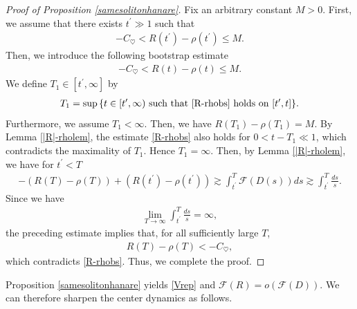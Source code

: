 \documentclass[10pt,a4paper]{amsart}
\numberwithin{equation}{section}
\begin{document}
\begin{proof}[Proof of Proposition \ref{samesolitonhanare}]
Fix an arbitrary constant $M>0$. First, we assume that there exists $t^{\prime}\gg 1$ such that 
\begin{align*}
-C_{\heartsuit}<R(t^{\prime})-\rho(t^{\prime})\leq M.
\end{align*}
Then, we introduce the following bootstrap estimate
\begin{align}\label{R-rhobs}
-C_{\heartsuit}<R(t)-\rho(t)\leq M.
\end{align}
We define $T_1\in [t^{\prime},\infty]$ by
\begin{align}\label{rho-RnoT1}
T_1=\sup{ \{t\in[t^{\prime},\infty)\ \mbox{such that}\ \eqref{R-rhobs}\ \mbox{holds on}\ [t^{\prime},t] \} }.
\end{align}
Furthermore, we assume $T_1<\infty$. Then, we have $R(T_1)-\rho(T_1)=M$. By Lemma \ref{|R|-rholem}, the estimate \eqref{R-rhobs} also holds for $0<t-T_1\ll 1$, which contradicts the maximality of $T_1$. Hence $T_1=\infty$. Then, by Lemma \ref{|R|-rholem}, we have for $t^{\prime}<T$
\begin{align*}
-\left(R(T)-\rho(T)\right)+\left(R(t^{\prime})-\rho(t^{\prime})\right)\gtrsim\int_{t^{\prime}}^T\mathcal{F}(D(s))ds\gtrsim \int_{t^{\prime}}^T\frac{ds}{s}.
\end{align*}
Since we have
\begin{align*}
\lim_{T\to\infty}\int_{t^{\prime}}^T\frac{ds}{s}=\infty,
\end{align*}
the preceding estimate implies that, for all sufficiently large $T$,
\begin{align*}
R(T)-\rho(T)<-C_{\heartsuit},
\end{align*}
which contradicts \eqref{R-rhobs}. Thus, we complete the proof.
\end{proof}
Proposition \ref{samesolitonhanare} yields \eqref{Vrep} and
$\mathcal{F}(R)=o\left(\mathcal{F}(D)\right)$.
We can therefore sharpen the center dynamics as follows.
\end{document}
